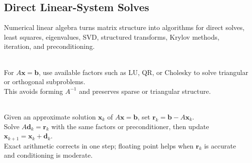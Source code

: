 \subsection{Direct Linear-System Solves}

%

Numerical linear algebra turns matrix structure into algorithms for direct solves, least squares, eigenvalues, SVD, structured transforms, Krylov methods, iteration, and preconditioning.

\begin{perspective} \label{per:solve-with-factors-not-inverses} \\
For $A\mathbf{x}=\mathbf{b}$, use available factors such as LU, QR, or Cholesky to solve triangular or orthogonal subproblems.\\
This avoids forming $A^{-1}$ and preserves sparse or triangular structure.
\end{perspective}

\begin{perspective} \label{per:iterative-refinement-residual-correction} \\
Given an approximate solution $\mathbf{x}_k$ of $A\mathbf{x}=\mathbf{b}$, set $\mathbf{r}_k=\mathbf{b}-A\mathbf{x}_k$.\\
Solve $A\mathbf{d}_k=\mathbf{r}_k$ with the same factors or preconditioner, then update $\mathbf{x}_{k+1}=\mathbf{x}_k+\mathbf{d}_k$.\\
Exact arithmetic corrects in one step; floating point helps when $\mathbf{r}_k$ is accurate and conditioning is moderate.
\end{perspective}
